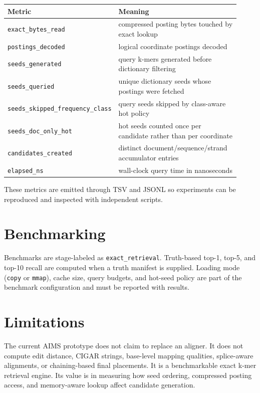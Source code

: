 \documentclass[11pt]{article}
\begin{document}
\begin{center}
\small
\begin{tabular}{p{0.36\linewidth}p{0.56\linewidth}}
\toprule
Metric & Meaning \\
\midrule
\texttt{exact\_bytes\_read} & compressed posting bytes touched by exact lookup \\
\texttt{postings\_decoded} & logical coordinate postings decoded \\
\texttt{seeds\_generated} & query k-mers generated before dictionary filtering \\
\texttt{seeds\_queried} & unique dictionary seeds whose postings were fetched \\
\texttt{seeds\_skipped\_frequency\_class} & query seeds skipped by class-aware hot policy \\
\texttt{seeds\_doc\_only\_hot} & hot seeds counted once per candidate rather than per coordinate \\
\texttt{candidates\_created} & distinct document/sequence/strand accumulator entries \\
\texttt{elapsed\_ns} & wall-clock query time in nanoseconds \\
\bottomrule
\end{tabular}
\end{center}

These metrics are emitted through TSV and JSONL so experiments can be reproduced and inspected with independent scripts.

\section{Benchmarking}

Benchmarks are stage-labeled as \texttt{exact\_retrieval}. Truth-based top-1, top-5, and top-10 recall are computed when a truth manifest is supplied. Loading mode (\texttt{copy} or \texttt{mmap}), cache size, query budgets, and hot-seed policy are part of the benchmark configuration and must be reported with results.

\section{Limitations}

The current AIMS prototype does not claim to replace an aligner. It does not compute edit distance, CIGAR strings, base-level mapping qualities, splice-aware alignments, or chaining-based final placements. It is a benchmarkable exact k-mer retrieval engine. Its value is in measuring how seed ordering, compressed posting access, and memory-aware lookup affect candidate generation.
\end{document}
